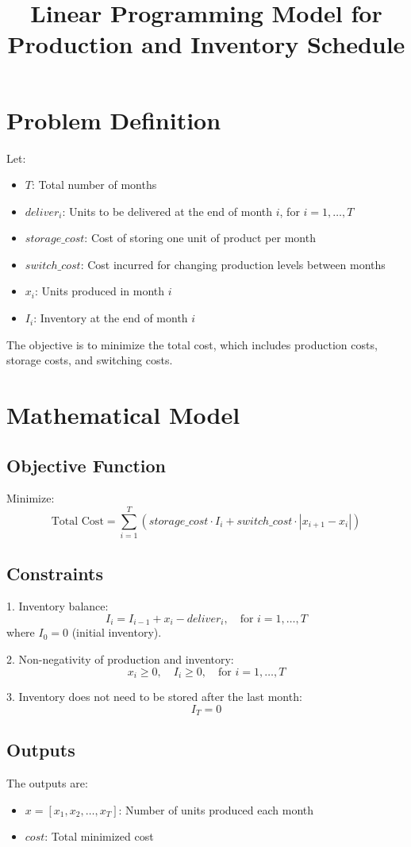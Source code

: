 \documentclass{article}
\begin{document}
\title{Linear Programming Model for Production and Inventory Schedule}
\author{}
\date{}
\maketitle

\section*{Problem Definition}

Let:
\begin{itemize}
    \item $T$: Total number of months
    \item $deliver_i$: Units to be delivered at the end of month $i$, for $i = 1, \ldots, T$
    \item $storage\_cost$: Cost of storing one unit of product per month
    \item $switch\_cost$: Cost incurred for changing production levels between months
    \item $x_i$: Units produced in month $i$
    \item $I_i$: Inventory at the end of month $i$
\end{itemize}

The objective is to minimize the total cost, which includes production costs, storage costs, and switching costs.

\section*{Mathematical Model}

\subsection*{Objective Function}
Minimize:
\[
\text{Total Cost} = \sum_{i=1}^{T} \left( storage\_cost \cdot I_i + switch\_cost \cdot |x_{i+1} - x_i| \right) 
\]

\subsection*{Constraints}
1. Inventory balance:
\[
I_i = I_{i-1} + x_i - deliver_i, \quad \text{for } i = 1, \ldots, T
\]
where $I_0 = 0$ (initial inventory).

2. Non-negativity of production and inventory:
\[
x_i \geq 0, \quad I_i \geq 0, \quad \text{for } i = 1, \ldots, T
\]

3. Inventory does not need to be stored after the last month:
\[
I_T = 0
\]

\subsection*{Outputs}
The outputs are:
\begin{itemize}
    \item $x = [x_1, x_2, \ldots, x_T]$: Number of units produced each month
    \item $cost$: Total minimized cost
\end{itemize}
\end{document}
